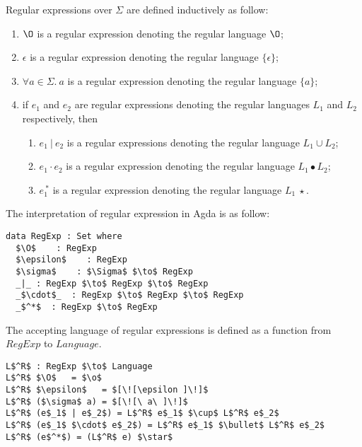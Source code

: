 \begin{defn}
\label{defn:regex}
\noindent Regular expressions over \(\Sigma\) are defined inductively as follow: 
\begin{enumerate}[nolistsep]
  \item \(\O\) is a regular expression denoting the regular language \(\O\);
  \item \(\epsilon\) is a regular expression denoting the regular language \(\{\epsilon\}\);
  \item \(\forall a\in\Sigma.\ a\) is a regular expression denoting the regular language \(\{a\}\);
  \item if \(e_{1}\) and \(e_{2}\) are regular expressions denoting the regular
    languages \(L_1\) and \(L_2\) respectively, then
    \begin{enumerate}[nolistsep]
      \item \(e_{1}\ |\ e_{2}\) is a regular expressions denoting the
        regular language \(L_1 \cup L_2\);
      \item \(e_{1}\cdot e_{2}\) is a regular expression denoting the
        regular language \(L_1\bullet L_2\);
      \item \(e_{1}^{\ *}\) is a regular expression denoting the regular
        language \(L_1\ \star\).
     \end{enumerate}
\end{enumerate}
\end{defn}

\par The interpretation of regular expression in Agda is as follow:

\begin{lstlisting}[mathescape=true,xleftmargin=.3\textwidth]
data RegExp : Set where
  $\O$    : RegExp
  $\epsilon$    : RegExp
  $\sigma$    : $\Sigma$ $\to$ RegExp
  _|_ : RegExp $\to$ RegExp $\to$ RegExp
  _$\cdot$_  : RegExp $\to$ RegExp $\to$ RegExp
  _$^*$  : RegExp $\to$ RegExp
\end{lstlisting} 

\par The accepting language of regular expressions is defined as
a function from \(RegExp\) to \(Language\). 

\begin{lstlisting}[mathescape=true,xleftmargin=.3\textwidth]
L$^R$ : RegExp $\to$ Language
L$^R$ $\O$   = $\o$
L$^R$ $\epsilon$   = $[\![\epsilon ]\!]$
L$^R$ ($\sigma$ a) = $[\![\ a\ ]\!]$
L$^R$ (e$_1$ | e$_2$) = L$^R$ e$_1$ $\cup$ L$^R$ e$_2$
L$^R$ (e$_1$ $\cdot$ e$_2$) = L$^R$ e$_1$ $\bullet$ L$^R$ e$_2$
L$^R$ (e$^*$) = (L$^R$ e) $\star$
\end{lstlisting} 